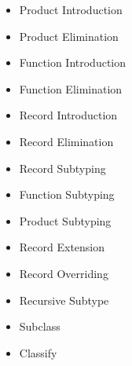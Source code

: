 \begin{itemize}
\item Product Introduction
\item Product Elimination
\item Function Introduction
\item Function Elimination
\item Record Introduction
\item Record Elimination
\item Record Subtyping
\item Function Subtyping
\item Product Subtyping
\item Record Extension
\item Record Overriding
\item Recursive Subtype
\item Subclass
\item Classify
\end{itemize}
